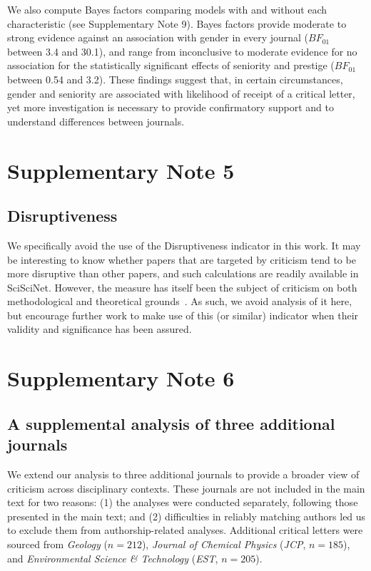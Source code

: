 \documentclass[12pt]{article} %
\begin{document}
We also compute Bayes factors comparing models with and without each characteristic (see Supplementary Note 9).
Bayes factors provide moderate to strong evidence against an association with gender in every journal ($BF_{01}$ between 3.4 and 30.1), and range from inconclusive to moderate evidence for no association for the statistically significant effects of seniority and prestige ($BF_{01}$ between 0.54 and 3.2). 
These findings suggest that, in certain circumstances, gender and seniority are associated with likelihood of receipt of a critical letter, yet more investigation is necessary to provide confirmatory support and to understand differences between journals. 

\section*{Supplementary Note 5}
\subsection*{Disruptiveness}
We specifically avoid the use of the Disruptiveness indicator in this work. 
It may be interesting to know whether papers that are targeted by criticism tend to be more disruptive than other papers, and such calculations are readily available in SciSciNet.
However, the measure has itself been the subject of criticism on both methodological and theoretical grounds~\cite{funk_2017_disruption,leibel_2024_disruption}. 
As such, we avoid analysis of it here, but encourage further work to make use of this (or similar) indicator when their validity and significance has been assured. 

\section*{Supplementary Note 6}
\label{si:text:supplemental-analysis}
\subsection*{A supplemental analysis of three additional journals}
We extend our analysis to three additional journals to provide a broader view of criticism across disciplinary contexts. These journals are not included in the main text for two reasons: (1) the analyses were conducted separately, following those presented in the main text; and (2) difficulties in reliably matching authors led us to exclude them from authorship-related analyses.
Additional critical letters were sourced from \textit{Geology} ($n = 212$), \textit{Journal of Chemical Physics} (\textit{JCP}, $n = 185$), and \textit{Environmental Science \& Technology} (\textit{EST}, $n = 205$).
\end{document}
